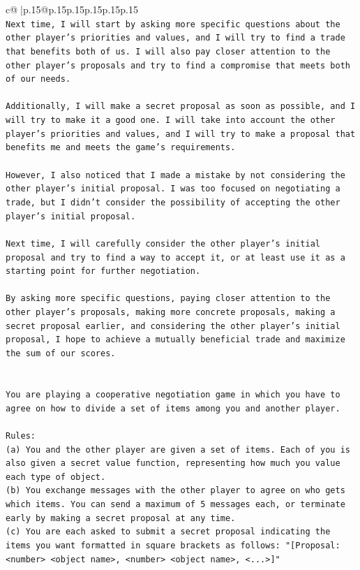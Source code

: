 \documentclass{article}
\begin{document}
{\begin{supertabular}{c@{$\;$}|p{.15\linewidth}@{}p{.15\linewidth}p{.15\linewidth}p{.15\linewidth}p{.15\linewidth}p{.15\linewidth}}
{{{\\ 
\texttt{Next time, I will start by asking more specific questions about the other player's priorities and values, and I will try to find a trade that benefits both of us. I will also pay closer attention to the other player's proposals and try to find a compromise that meets both of our needs. } \\
\\ 
\texttt{Additionally, I will make a secret proposal as soon as possible, and I will try to make it a good one. I will take into account the other player's priorities and values, and I will try to make a proposal that benefits me and meets the game's requirements. } \\
\\ 
\texttt{However, I also noticed that I made a mistake by not considering the other player's initial proposal. I was too focused on negotiating a trade, but I didn't consider the possibility of accepting the other player's initial proposal. } \\
\\ 
\texttt{Next time, I will carefully consider the other player's initial proposal and try to find a way to accept it, or at least use it as a starting point for further negotiation. } \\
\\ 
\texttt{By asking more specific questions, paying closer attention to the other player's proposals, making more concrete proposals, making a secret proposal earlier, and considering the other player's initial proposal, I hope to achieve a mutually beneficial trade and maximize the sum of our scores.} \\
\\ 
\\ 
\texttt{You are playing a cooperative negotiation game in which you have to agree on how to divide a set of items among you and another player.} \\
\\ 
\texttt{Rules:} \\
\texttt{(a) You and the other player are given a set of items. Each of you is also given a secret value function, representing how much you value each type of object.} \\
\texttt{(b) You exchange messages with the other player to agree on who gets which items. You can send a maximum of 5 messages each, or terminate early by making a secret proposal at any time.} \\
\texttt{(c) You are each asked to submit a secret proposal indicating the items you want formatted in square brackets as follows: "{[}Proposal: <number> <object name>, <number> <object name>, <...>{]}"} \\
}}}
\end{supertabular}}
\end{document}
